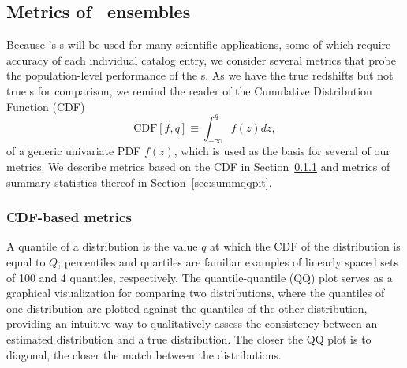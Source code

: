 \subsection{Metrics of \pzpdf \ ensembles}
\label{sec:qualmet}

Because \lsst's \pzpdf s will be used for many scientific applications, some of which require accuracy of each individual catalog entry, we consider several metrics that probe the population-level performance of the \pzpdf s.
As we have the true redshifts but not true \pzpdf s for comparison, we remind the reader of the Cumulative Distribution Function (CDF)
\begin{equation}
  \label{eq:cdf}
  \mathrm{CDF}[f, q] \equiv \int_{-\infty}^{q} f(z) dz,
\end{equation}
of a generic univariate PDF $f(z)$, which is used as the basis for several of our metrics.
We describe metrics based on the CDF in Section~\ref{sec:qqpit} and metrics of summary statistics thereof in Section~\ref{sec:summqqpit}.

\subsubsection{CDF-based metrics}
\label{sec:qqpit}

A quantile of a distribution is the value $q$ at which the CDF of the distribution is equal to $Q$; percentiles and quartiles are familiar examples of linearly spaced sets of 100 and 4 quantiles, respectively.
The quantile-quantile (QQ) plot serves as a graphical visualization for comparing two distributions, where the quantiles of one distribution are plotted against the quantiles of the other distribution, providing an intuitive way to qualitatively assess the consistency between an estimated distribution and a true distribution.
The closer the QQ plot is to diagonal, the closer the match between the distributions.

